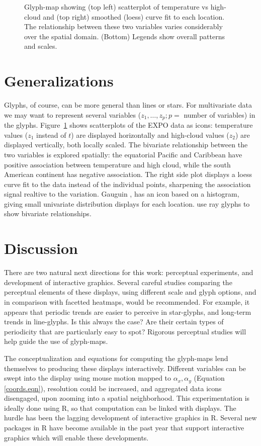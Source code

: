 \documentclass[oneside]{article}
\begin{document}
\begin{figure}[htbp]
  \caption{Glyph-map showing (top left) scatterplot of temperature vs high-cloud and (top right) smoothed (loess) curve fit to each location. The relationship between these two variables varies considerably over the spatial domain. (Bottom) Legends show overall patterns and scales.}
  \label{fig:cloud}
\end{figure}

\section{Generalizations}

Glyphs, of course, can be more general than lines or stars. For multivariate data we may want to represent several variables ($z_1, \dots, z_p; p=$ number of variables) in the glyphs. Figure~\ref{fig:cloud} shows scatterplots of the EXPO data as icons: temperature values ($z_1$ instead of $t$) are displayed horizontally and high-cloud values ($z_2$) are displayed vertically, both locally scaled. The bivariate relationship between the two variables is explored spatially: the equatorial Pacific and Caribbean have positive association between temperature and high cloud, while the south American continent has negative association. The right side plot displays a loess curve fit to the data instead of the individual points, sharpening the association signal realtive to the variation. Gauguin \citep{gribov:2006}, has an icon based on a histogram, giving small univariate distribution displays for each location. \citet{carr:1992} use ray glyphs to show bivariate relationships.

\section{Discussion}

There are two natural next directions for this work: perceptual experiments, and development of interactive graphics. Several careful studies comparing the perceptual elements of these displays, using different scale and glyph options, and in comparison with facetted heatmaps, would be recommended. For example, it appears that periodic trends are easier to perceive in star-glyphs, and long-term trends in line-glyphs. Is this always the case? Are their certain types of periodicity that are particularly easy to spot? Rigorous perceptual studies will help guide the use of glyph-maps.

The conceptualization and equations for computing the glyph-maps lend themselves to producing these displays interactively. Different variables can be swept into the display using mouse motion mapped to $\alpha_x, \alpha_y$ (Equation \ref{coords.eqn}), resolution could be increased, and aggregated data icons disengaged, upon zooming into a spatial neighborhood. This experimentation is ideally done using R, so that computation can be linked with displays. The hurdle has been the lagging development of interactive graphics in R. Several new packages  in R have become available in the past year \citep{qtbase, qtpaint, plumbr} that support interactive graphics which will enable these developments.
\end{document}
